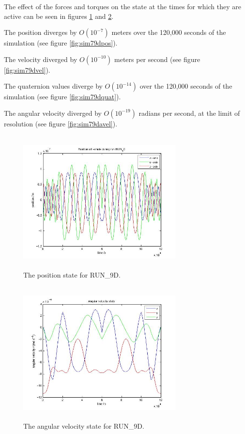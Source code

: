 \begin{description}
The effect of the forces and torques on the state at the times for which they 
are active can be seen in figures \ref{fig:sim79dposoverall} and 
\ref{fig:sim79daveloverall}.

The position diverges by $O(10^{-7})$ meters over the 120,000 seconds of the 
simulation (see figure \ref{fig:sim79dpos}).

The velocity diverged by $O(10^{-10})$ meters per second (see figure 
\ref{fig:sim79dvel}).

The quaternion values diverge by $O(10^{-14})$ over the 120,000 seconds of the 
simulation (see figure \ref{fig:sim79dquat}).

The angular velocity diverged by $O(10^{-19})$ radians per second, at the limit 
of resolution (see figure \ref{fig:sim79davel}).


\begin{figure}[htp]
\begin{center}
\includegraphics[width=3.2736in,height=2.85in]{figures/run_9dposoverall.jpg}
\caption{The position state for RUN\_9D.}
\label{fig:sim79dposoverall}
\end{center}
\end{figure}

\begin{figure}[htp]
\begin{center}
\includegraphics[width=3.2736in,height=2.85in]{figures/run_9daveloverall.jpg}
\caption{The angular velocity state for RUN\_9D.}
\label{fig:sim79daveloverall}
\end{center}
\end{figure}


\end{description}

